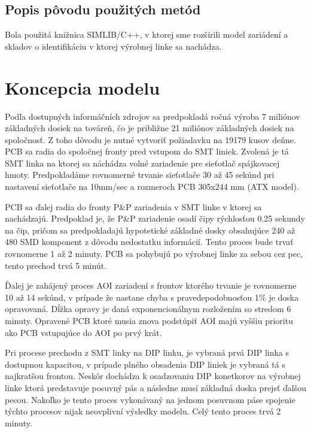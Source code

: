 \documentclass[12pt,a4paper,titlepage,final]{article}
\begin{document}
\subsection{Popis pôvodu použitých metód}
Bola použitá knižnica SIMLIB/C++, v ktorej sme rozšírili model zariádení a 
skladov o identifikáciu v ktorej výrobnej linke sa nachádza.

\section{Koncepcia modelu}

Podľa dostupných informáčních zdrojov sa predpokladá ročná výroba 7 miliónov
základných dosiek na továreň, čo je približne 21 miliónov základných dosiek
na spoločnosť. Z toho dôvodu je nutné vytvoriť požiadavku na 19179 kusov deňne.
PCB sa radia do spoločnej fronty pred vstupom do SMT liniek. Zvolená je tá SMT
linka na ktorej sa náchádza volné zariadenie pre sieťotlač spájkovacej hmoty.
Predpokladáme rovnomerné trvanie sieťotlače 30 až 45 sekúnd pri nastavení sieťotlače
na 10mm/sec a rozmeroch PCB 305x244 mm (ATX model).

PCB sa ďalej radia do fronty P\&P zariadenia v SMT linke v ktorej sa nachádzajú.
Predpoklad je, že P\&P zariadenie osadí čipy rýchlosťou 0.25 sekundy na čip, pričom
sa predpokladajú hypotetické základné dosky obsahujúce 240 až 480 SMD komponent
z dôvodu nedostatku informácií. Tento proces bude trvať rovnomerne 1 až 2 minuty.
PCB sa pohybujú po výrobnej linke za sebou cez pec, tento prechod trvá 5 minút.

Ďalej je zahájený proces AOI zariadení s frontov ktorého trvanie je rovnomerne 10 až 14 sekúnd, v 
prípade že nastane chyba s pravedepodobnosťou 1\% je doska opravovaná. Dĺžka
opravy je daná exponencionálnym rozložením so stredom 6 minuty. Opravené PCB
ktoré musia znova podstúpiť AOI majú vyššiu prioritu ako PCB vstupujúce do AOI 
po prvý krát.

Pri procese prechodu z SMT linky na DIP linku, je vybraná prvá DIP linka s dostupnou
kapacitou, v prípade plného obsadenia DIP liniek je vybraná tá s najkratšou
frontou. Neskôr dochádza k osadzovaniu DIP konetkorov na výrobnej linke
ktorá predstavuje posuvný pás a následne musí základná doska prejsť ďalšou
pecou. Nakoľko je tento proces vykonávaný na jednom posuvnom páse spojenie týchto
procesov nijak neovplivní výsledky modelu. Celý tento proces trvá 2 minuty.
\end{document}
